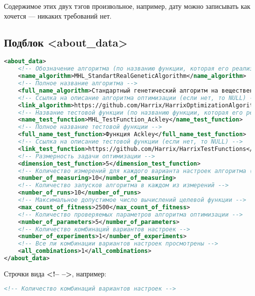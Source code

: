\documentclass[a4paper,12pt]{article}
\begin{document}
Содержимое этих двух тэгов произвольное, например, дату можно записывать как хочется --- никаких требований нет.

\subsection{Подблок <about\_data>}

\begin{lstlisting}[label=Part05, language=xml ,caption=Подблок в файле Harrix Optimization Testing]
<about_data>
	<!-- Обозначение алгоритма (по названию функции, которая его реализует) -->
	<name_algorithm>MHL_StandartRealGeneticAlgorithm</name_algorithm>
	<!-- Полное название алгоритма -->
	<full_name_algorithm>Стандартный генетический алгоритм на вещественных строках</full_name_algorithm>
	<!-- Ссылка на описание алгоритма оптимизации (если нет, то NULL) -->
	<link_algorithm>https://github.com/Harrix/HarrixOptimizationAlgorithms</link_algorithm>
	<!-- Название тестовой функции (по названию функции, которая его реализует) -->
	<name_test_function>MHL_TestFunction_Ackley</name_test_function>
	<!-- Полное название тестовой функции -->
	<full_name_test_function>Функция Ackley</full_name_test_function>
	<!-- Ссылка на описание тестовой функции (если нет, то NULL) -->
	<link_test_function>https://github.com/Harrix/HarrixTestFunctions</link_test_function>
	<!-- Размерность задачи оптимизации -->
	<dimension_test_function>5</dimension_test_function>
	<!-- Количество измерений для каждого варианта настроек алгоритма (сколько точек получим) -->
	<number_of_measuring>10</number_of_measuring>
	<!-- Количество запусков алгоритма в каждом из измерений -->
	<number_of_runs>10</number_of_runs>
	<!-- Максимальное допустимое число вычислений целевой функции -->
	<max_count_of_fitness>2500</max_count_of_fitness>
	<!-- Количество проверяемых параметров алгоритма оптимизации -->
	<number_of_parameters>5</number_of_parameters>
	<!-- Количество комбинаций вариантов настроек -->
	<number_of_experiments>1</number_of_experiments>
	<!-- Все ли комбинации вариантов настроек просмотрены -->
	<all_combinations>1</all_combinations>
</about_data>
\end{lstlisting}

Строчки вида \textbf{<!--  -->}, например:

\begin{lstlisting}[label=Part06, language=xml ,caption=Комментарий в файле Harrix Optimization Testing]
<!-- Количество комбинаций вариантов настроек -->
\end{lstlisting}
\end{document}
